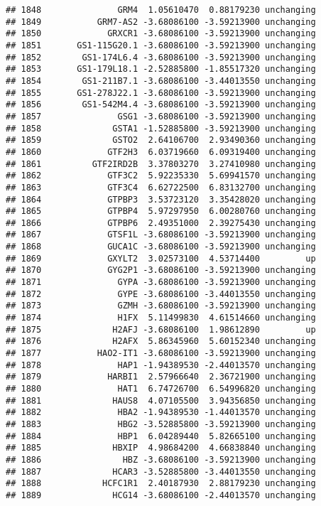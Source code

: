 \documentclass[]{article}
\begin{document}
\begin{verbatim}
## 1848               GRM4  1.05610470  0.88179230 unchanging
## 1849           GRM7-AS2 -3.68086100 -3.59213900 unchanging
## 1850             GRXCR1 -3.68086100 -3.59213900 unchanging
## 1851       GS1-115G20.1 -3.68086100 -3.59213900 unchanging
## 1852        GS1-174L6.4 -3.68086100 -3.59213900 unchanging
## 1853       GS1-179L18.1 -2.52885800 -1.85517320 unchanging
## 1854        GS1-211B7.1 -3.68086100 -3.44013550 unchanging
## 1855       GS1-278J22.1 -3.68086100 -3.59213900 unchanging
## 1856        GS1-542M4.4 -3.68086100 -3.59213900 unchanging
## 1857               GSG1 -3.68086100 -3.59213900 unchanging
## 1858              GSTA1 -1.52885800 -3.59213900 unchanging
## 1859              GSTO2  2.64106700  2.93490360 unchanging
## 1860             GTF2H3  6.03719660  6.09319400 unchanging
## 1861          GTF2IRD2B  3.37803270  3.27410980 unchanging
## 1862             GTF3C2  5.92235330  5.69941570 unchanging
## 1863             GTF3C4  6.62722500  6.83132700 unchanging
## 1864             GTPBP3  3.53723120  3.35428020 unchanging
## 1865             GTPBP4  5.97297950  6.00280760 unchanging
## 1866             GTPBP6  2.49351000  2.39275430 unchanging
## 1867             GTSF1L -3.68086100 -3.59213900 unchanging
## 1868             GUCA1C -3.68086100 -3.59213900 unchanging
## 1869             GXYLT2  3.02573100  4.53714400         up
## 1870             GYG2P1 -3.68086100 -3.59213900 unchanging
## 1871               GYPA -3.68086100 -3.59213900 unchanging
## 1872               GYPE -3.68086100 -3.44013550 unchanging
## 1873               GZMH -3.68086100 -3.59213900 unchanging
## 1874               H1FX  5.11499830  4.61514660 unchanging
## 1875              H2AFJ -3.68086100  1.98612890         up
## 1876              H2AFX  5.86345960  5.60152340 unchanging
## 1877           HAO2-IT1 -3.68086100 -3.59213900 unchanging
## 1878               HAP1 -1.94389530 -2.44013570 unchanging
## 1879             HARBI1  2.57966640  2.36721900 unchanging
## 1880               HAT1  6.74726700  6.54996820 unchanging
## 1881              HAUS8  4.07105500  3.94356850 unchanging
## 1882               HBA2 -1.94389530 -1.44013570 unchanging
## 1883               HBG2 -3.52885800 -3.59213900 unchanging
## 1884               HBP1  6.04289440  5.82665100 unchanging
## 1885              HBXIP  4.98684200  4.66838840 unchanging
## 1886                HBZ -3.68086100 -3.59213900 unchanging
## 1887              HCAR3 -3.52885800 -3.44013550 unchanging
## 1888            HCFC1R1  2.40187930  2.88179230 unchanging
## 1889              HCG14 -3.68086100 -2.44013570 unchanging

\end{verbatim}
\end{document}
